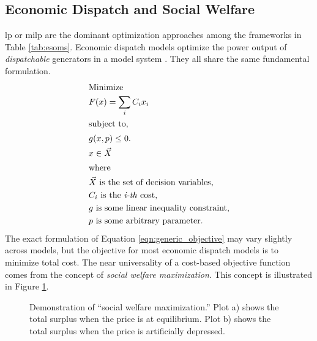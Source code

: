 \subsection{Economic Dispatch and Social Welfare}
\Ac{lp} or \ac{milp} are the dominant optimization approaches among the
frameworks in Table \ref{tab:esoms}. Economic dispatch models optimize the power
output of \textit{dispatchable} generators in a model system
\cite{de_queiroz_repurposing_2019, neumann_near-optimal_2021}. They all share
the same fundamental formulation.
\begin{align}
    \intertext{Minimize}
    \label{eqn:generic_objective}
    &F(x) = \sum_i C_i x_i\\
    \intertext{subject to,}
    &g(x, p) \leq 0.\nonumber\\
    &x \in \vec{X}\nonumber\\
    \intertext{where}
    &\vec{X} \text{ is the set of decision variables,}\nonumber\\
    & C_i \text{ is the \textit{i-th} cost,}\nonumber\\
    & g \text{ is some linear inequality constraint,}\nonumber\\
    & p \text{ is some arbitrary parameter.}\nonumber
\end{align}
The exact formulation of Equation \ref{eqn:generic_objective} may vary slightly
across models, but the objective for most economic dispatch models is to
minimize total cost. The near universality of a cost-based objective function
comes from the concept of \textit{social welfare maximization}. This concept is
illustrated in Figure \ref{fig:social-max}.

\begin{figure}[H]
  \centering
  \resizebox{\columnwidth}{!}{}
  \caption{Demonstration of ``social welfare maximization.'' Plot a) shows the
  total surplus when the price is at equilibrium. Plot b) shows the total
  surplus when the price is artificially depressed.}
  \label{fig:social-max}
\end{figure}

